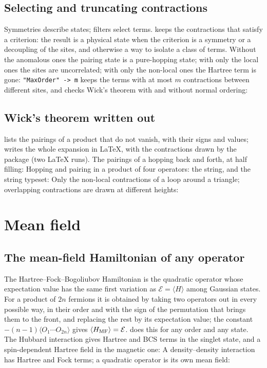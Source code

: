 \documentclass[11pt,a4paper]{article}
\begin{document}
\subsection{Selecting and truncating contractions}
Symmetries describe states; filters select terms.  keeps the contractions that satisfy a criterion: the
result is a physical state when the criterion is a symmetry or a decoupling of the sites, and otherwise a way to isolate a
class of terms. Without the anomalous ones the pairing state is a
pure-hopping state; with only the local ones the sites are uncorrelated; with only the non-local ones the Hartree term is
gone:
\texttt{"MaxOrder" -> m} keeps the terms with at most $m$ contractions between different sites, and
 checks Wick's theorem with and without normal ordering:

\subsection{Wick's theorem written out}
 lists the pairings of a product that do not vanish, with their signs and values;  writes the
whole expansion in \LaTeX, with the contractions drawn by the package  (two \LaTeX{} runs). The pairings
of a hopping back and forth, at half filling:
Hopping and pairing in a product of four operators: the string, and the string typeset:
Only the non-local contractions of a loop around a triangle; overlapping contractions are drawn at different heights:

\section{Mean field}
\subsection{The mean-field Hamiltonian of any operator}
The Hartree--Fock--Bogoliubov Hamiltonian is the quadratic operator whose expectation value has the same first variation
as $\mathcal E=\langle H\rangle$ among Gaussian states. For a product of $2n$ fermions it is obtained by taking two
operators out in every possible way, in their order and with the sign of the permutation that brings them to the front,
and replacing the rest by its expectation value; the constant $-(n-1)\langle O_1\cdots O_{2n}\rangle$ gives
$\langle H_{\rm MF}\rangle=\mathcal E$.  does this for any order and any state. The Hubbard interaction gives
Hartree and BCS terms in the singlet state, and a spin-dependent Hartree field in the magnetic one:
A density--density interaction has Hartree and Fock terms; a quadratic operator is its own mean field:
\end{document}

